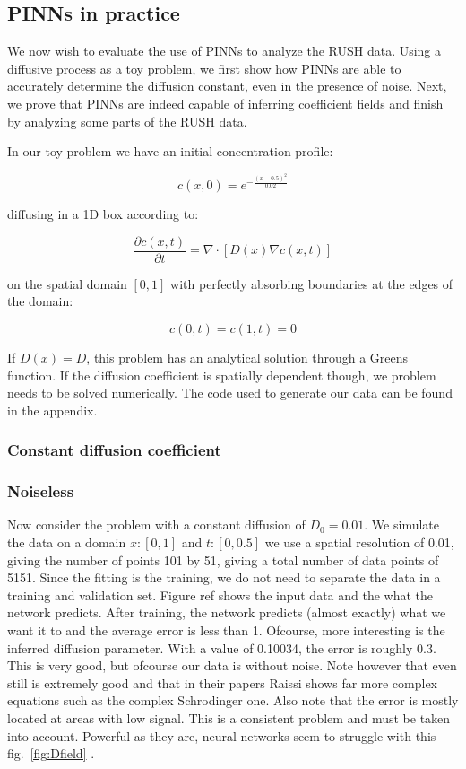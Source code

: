 \documentclass[12pt,a4paper,]{harvard-thesis}
\begin{document}
\hypertarget{pinns-in-practice}{%
\subsection{PINNs in practice}\label{pinns-in-practice}}

We now wish to evaluate the use of PINNs to analyze the RUSH data. Using
a diffusive process as a toy problem, we first show how PINNs are able
to accurately determine the diffusion constant, even in the presence of
noise. Next, we prove that PINNs are indeed capable of inferring
coefficient fields and finish by analyzing some parts of the RUSH data.

In our toy problem we have an initial concentration profile:

\[
c(x, 0) = e^{-\frac{(x-0.5)^2}{0.02}}
\]

diffusing in a 1D box according to:

\[
\frac{\partial c(x,t)}{\partial t} = \nabla \cdot[D(x)\nabla c(x,t)]
\]

on the spatial domain \([0,1]\) with perfectly absorbing boundaries at
the edges of the domain:

\[
c(0,t) = c(1,t) = 0
\]

If \(D(x) = D\), this problem has an analytical solution through a
Greens function. If the diffusion coefficient is spatially dependent
though, we problem needs to be solved numerically. The code used to
generate our data can be found in the appendix.

\hypertarget{constant-diffusion-coefficient}{%
\subsubsection{Constant diffusion
coefficient}\label{constant-diffusion-coefficient}}

\hypertarget{noiseless}{%
\subsubsection*{Noiseless}\label{noiseless}}

Now consider the problem with a constant diffusion of \(D_0 = 0.01\). We
simulate the data on a domain \(x:[0,1]\) and \(t:[0,0.5]\) we use a
spatial resolution of 0.01, giving the number of points 101 by 51,
giving a total number of data points of 5151. Since the fitting is the
training, we do not need to separate the data in a training and
validation set. Figure ref shows the input data and the what the network
predicts. After training, the network predicts (almost exactly) what we
want it to and the average error is less than 1. Ofcourse, more
interesting is the inferred diffusion parameter. With a value of
0.10034, the error is roughly 0.3. This is very good, but ofcourse our
data is without noise. Note however that even still is extremely good
and that in their papers Raissi shows far more complex equations such as
the complex Schrodinger one. Also note that the error is mostly located
at areas with low signal. This is a consistent problem and must be taken
into account. Powerful as they are, neural networks seem to struggle
with this fig.~\ref{fig:Dfield} .
\end{document}
